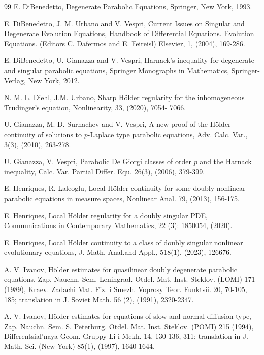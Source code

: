 \documentclass[a4paper,11pt,fullpage]{article}
\numberwithin{equation}{section}
\begin{document}
\begin{thebibliography}{99}
E. DiBenedetto, Degenerate Parabolic Equations, Springer, New York, 1993.

E.  DiBenedetto, J. M. Urbano and V. Vespri, Current Issues on Singular and Degenerate Evolution
 Equations, Handbook of Differential Equations. Evolution Equations. (Editors C. Dafermos and E. Feireisl)
 Elsevier,  1, (2004), 169-286.

E. DiBenedetto, U. Gianazza and V. Vespri, Harnack's inequality for degenerate and singular parabolic
 equations, Springer Monographs in Mathematics, Springer-Verlag, New York, 2012. 

N. M. L. Diehl, J.M. Urbano, Sharp H\"{o}lder regularity for the inhomogeneous Trudinger's
equation, Nonlinearity, 33, (2020), 7054- 7066.
 

 U. Gianazza, M. D. Surnachev and V. Vespri,  A new proof of the H\"{o}lder continuity of solutions
 to $p$-Laplace type parabolic equations, Adv. Calc. Var., 3(3), (2010),  263-278.
 
U. Gianazza, V. Vespri, Parabolic De Giorgi classes of order $p$ and the Harnack inequality,
Calc. Var. Partial Differ. Equ. 26(3), (2006), 379-399. 

E. Henriques, R. Laleoglu,  Local H\"{o}lder continuity for some doubly nonlinear parabolic
 equations in measure spaces, Nonlinear Anal. 79,  (2013), 156-175.
 
 E. Henriques, Local H\"{o}lder regularity for a doubly singular PDE, Communications in
Contemporary Mathematics, 22 (3): 1850054, (2020).
 
E. Henriques, Local H\"{o}lder continuity to a class of doubly singular nonlinear evolutionary equations,
J. Math. Anal.and Appl., 518(1), (2023), 126676.

A. V. Ivanov, H\"{o}lder estimates for quasilinear doubly degenerate parabolic equations, Zap. Nauchn. Sem.
 Leningrad. Otdel. Mat. Inst. Steklov. (LOMI) 171 (1989), Kraev. Zadachi Mat. Fiz. i Smezh. Voprosy Teor.
 Funktsii. 20, 70-105, 185; translation in J. Soviet Math. 56 (2), (1991),  2320-2347.

A. V. Ivanov, H\"{o}lder estimates for equations of slow and normal diffusion type, Zap. Nauchn. Sem. S.
Peterburg. Otdel. Mat. Inst. Steklov. (POMI) 215 (1994), Differentsial'naya Geom. Gruppy Li i Mekh. 14,
 130-136, 311; translation in J. Math. Sci. (New York) 85(1), (1997),  1640-1644.
 

\end{thebibliography}
\end{document}
